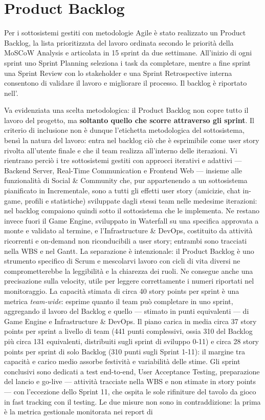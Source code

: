 \section{Product Backlog}

Per i sottosistemi gestiti con metodologie Agile è stato realizzato un Product Backlog, la lista prioritizzata del lavoro ordinata secondo le priorità della MoSCoW Analysis e articolata in 15 sprint da due settimane. All'inizio di ogni sprint uno Sprint Planning seleziona i task da completare, mentre a fine sprint una Sprint Review con lo stakeholder e una Sprint Retrospective interna consentono di validare il lavoro e migliorare il processo. Il backlog è riportato nell'.

Va evidenziata una scelta metodologica: il Product Backlog non copre tutto il lavoro del progetto, ma \textbf{soltanto quello che scorre attraverso gli sprint}. Il criterio di inclusione non è dunque l'etichetta metodologica del sottosistema, bensì la natura del lavoro: entra nel backlog ciò che è esprimibile come user story rivolta all'utente finale e che il team realizza all'interno delle iterazioni. Vi rientrano perciò i tre sottosistemi gestiti con approcci iterativi e adattivi --- Backend Server, Real-Time Communication e Frontend Web --- insieme alle funzionalità di Social \& Community che, pur appartenendo a un sottosistema pianificato in Incrementale, sono a tutti gli effetti user story (amicizie, chat in-game, profili e statistiche) sviluppate dagli stessi team nelle medesime iterazioni: nel backlog compaiono quindi sotto il sottosistema che le implementa. Ne restano invece fuori il Game Engine, sviluppato in Waterfall su una specifica approvata a monte e validato al termine, e l'Infrastructure \& DevOps, costituito da attività ricorrenti e on-demand non riconducibili a user story; entrambi sono tracciati nella WBS e nel Gantt. La separazione è intenzionale: il Product Backlog è uno strumento specifico di Scrum e mescolarvi lavoro con cicli di vita diversi ne comprometterebbe la leggibilità e la chiarezza dei ruoli. Ne consegue anche una precisazione sulla velocity, utile per leggere correttamente i numeri riportati nel monitoraggio. La capacità stimata di circa 40 story points per sprint è una metrica \textit{team-wide}: esprime quanto il team può completare in uno sprint, aggregando il lavoro del Backlog e quello --- stimato in punti equivalenti --- di Game Engine e Infrastructure \& DevOps. Il piano carica in media circa 37 story points per sprint a livello di team (441 punti complessivi, ossia 310 del Backlog più circa 131 equivalenti, distribuiti sugli sprint di sviluppo 0-11) e circa 28 story points per sprint di solo Backlog (310 punti sugli Sprint 1-11): il margine tra capacità e carico medio assorbe festività e variabilità delle stime. Gli sprint conclusivi sono dedicati a test end-to-end, User Acceptance Testing, preparazione del lancio e go-live --- attività tracciate nella WBS e non stimate in story points --- con l'eccezione dello Sprint 11, che ospita le sole rifiniture del tavolo da gioco in fast tracking con il testing. Le due misure non sono in contraddizione: la prima è la metrica gestionale monitorata nei report di 
